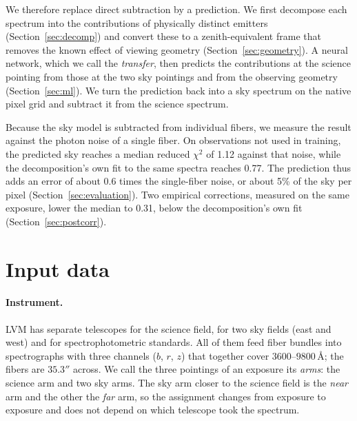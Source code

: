 We therefore replace direct subtraction by a prediction. We first decompose
each spectrum into the contributions of physically distinct emitters
(Section~\ref{sec:decomp}) and convert these to a zenith-equivalent frame
that removes the known effect of viewing geometry
(Section~\ref{sec:geometry}). A neural network, which we call the
\emph{transfer}, then predicts the contributions at the science pointing from
those at the two sky pointings and from the observing geometry
(Section~\ref{sec:ml}). We turn the prediction back into a sky spectrum on
the native pixel grid and subtract it from the science spectrum.

Because the sky model is subtracted from individual fibers, we measure the
result against the photon noise of a single fiber. On observations not used
in training, the predicted sky reaches a median reduced $\chi^2$ of 1.12
against that noise, while the decomposition's own fit to the same spectra
reaches 0.77. The prediction thus adds an error of about 0.6 times the
single-fiber noise, or about 5\% of the sky per pixel
(Section~\ref{sec:evaluation}). Two empirical corrections, measured on the
same exposure, lower the median to 0.31, below the decomposition's own fit
(Section~\ref{sec:postcorr}).

\section{Input data}
\label{sec:inputs}

\paragraph{Instrument.} LVM has separate telescopes for the science field,
for two sky fields (east and west) and for spectrophotometric standards. All
of them feed fiber bundles into spectrographs with three channels ($b$, $r$,
$z$) that together cover $3600$--$9800$\,\AA; the fibers are $35.3''$
across. We call the three pointings of an exposure its \emph{arms}: the
science arm and two sky arms. The sky arm closer to the science field is the
\emph{near} arm and the other the \emph{far} arm, so the assignment changes
from exposure to exposure and does not depend on which telescope took the
spectrum.

